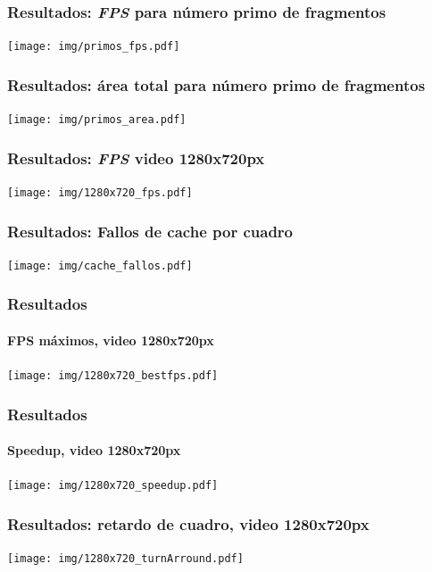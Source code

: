 \documentclass[11pt,a4paper,spanish]{beamer}
\begin{document}
\begin{frame}

\frametitle{Resultados: \emph{FPS} para número primo de fragmentos}

\texttt{[image: img/primos\_fps.pdf]}

\end{frame}

\begin{frame}

\frametitle{Resultados: área total para número primo de fragmentos}

\texttt{[image: img/primos\_area.pdf]}

\end{frame}

\begin{frame}

\frametitle{Resultados: \emph{FPS} video 1280x720px}

\texttt{[image: img/1280x720\_fps.pdf]}

\end{frame}

\begin{frame}

\frametitle{Resultados: Fallos de cache por cuadro}

\texttt{[image: img/cache\_fallos.pdf]}

\end{frame}

\begin{frame}

\frametitle{Resultados}

\framesubtitle{FPS máximos, video 1280x720px}

\texttt{[image: img/1280x720\_bestfps.pdf]}

\end{frame}

\begin{frame}

\frametitle{Resultados}

\framesubtitle{Speedup, video 1280x720px}

\texttt{[image: img/1280x720\_speedup.pdf]}

\end{frame}

\begin{frame}

\frametitle{Resultados: retardo de cuadro, video 1280x720px}

\texttt{[image: img/1280x720\_turnArround.pdf]}

\end{frame}
\end{document}

